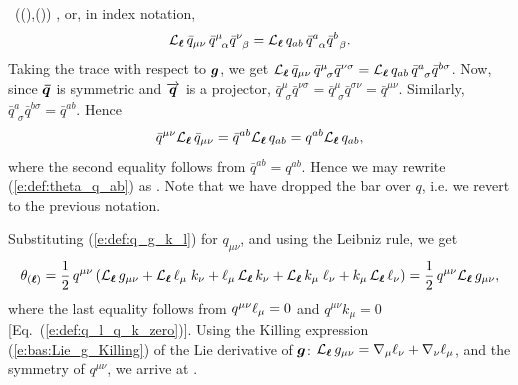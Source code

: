     \Lie{\el}  \, ((),()) ,
\ee
or, in index notation,
\[
    \Liec{\el} {\bar q}_{\mu\nu} \, {\bar q}^\mu_{\ \, \alpha} {\bar q}^\nu_{\ \, \beta} =
        \Liec{\el} {q}_{ab} \, {\bar q}^a_{\ \, \alpha} {\bar q}^b_{\ \, \beta} .
\]
Taking the trace with respect to $\bm{g}$, we get
$ {\mathcal{L}}_{\bm{\ell}}\, {\bar q}_{\mu\nu} \, {\bar q}^\mu_{\ \, \sigma} {\bar q}^{\nu\sigma} =
        {\mathcal{L}}_{\bm{\ell}}\, {q}_{ab} \, {\bar q}^a_{\ \, \sigma} {\bar q}^{b\sigma}$.
Now, since $\bm{\bar q}$ is symmetric and $\overrightarrow{\bm{q}}$ is a projector,
${\bar q}^\mu_{\ \, \sigma} {\bar q}^{\nu\sigma} = {\bar q}^\mu_{\ \, \sigma} {\bar q}^{\sigma\nu}
 = {\bar q}^{\mu\nu}$. Similarly, ${\bar q}^a_{\ \, \sigma} {\bar q}^{b\sigma} = {\bar q}^{ab}$.
Hence
\[
    {\bar q}^{\mu\nu} {\mathcal{L}}_{\bm{\ell}}\, {\bar q}_{\mu\nu} = {\bar q}^{ab}  {\mathcal{L}}_{\bm{\ell}}\, {q}_{ab}
    = q^{ab}  {\mathcal{L}}_{\bm{\ell}}\, {q}_{ab} ,
\]
where the second equality follows from
${\bar q}^{ab}  = q^{ab}$.
Hence we may rewrite (\ref{e:def:theta_q_ab}) as
\be \label{e:def:theta_q_munu}
   .
\ee
Note that we have dropped the bar over $q$, i.e. we revert to the previous notation.

Substituting (\ref{e:def:q_g_k_l}) for $q_{\mu\nu}$, and using the Leibniz rule, we get
\[
    \theta_{(\bm{\ell})} = \frac{1}{2} \, q^{\mu\nu}  \left(
            {\mathcal{L}}_{\bm{\ell}}\, g_{\mu\nu} + {\mathcal{L}}_{\bm{\ell}}\,  \ell_\mu \; k_\nu + \ell_\mu \, {\mathcal{L}}_{\bm{\ell}}\, k_\nu
           + {\mathcal{L}}_{\bm{\ell}}\, k_\mu \; \ell_\nu + k_\mu \, {\mathcal{L}}_{\bm{\ell}}\, \ell_\nu \right)
           = \frac{1}{2} \, q^{\mu\nu}  {\mathcal{L}}_{\bm{\ell}}\, g_{\mu\nu}  ,
\]
where the last equality follows from $q^{\mu\nu} \ell_\mu = 0$
and  $q^{\mu\nu} k_\mu = 0$ [Eq.~(\ref{e:def:q_l_q_k_zero})]. Using
the Killing expression (\ref{e:bas:Lie_g_Killing}) of the Lie derivative of $\bm{g}$:
${\mathcal{L}}_{\bm{\ell}}\, g_{\mu\nu} = \nabla_\mu \ell_\nu + \nabla_\nu \ell_\mu$, and
the symmetry of $q^{\mu\nu}$, we arrive at
\be \label{e:def:theta_q_nabla_ell}
     .
\ee

